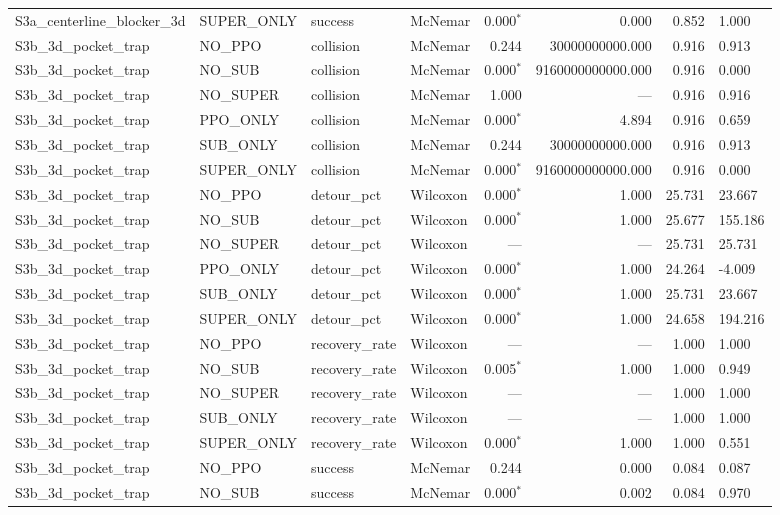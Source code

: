 \begin{tabular}{llllrrrl}
  S3a_centerline_blocker_3d & SUPER_ONLY & success & McNemar & 0.000$^{*}$ & 0.000 & 0.852 & 1.000 \\
  S3b_3d_pocket_trap & NO_PPO & collision & McNemar & 0.244 & 30000000000.000 & 0.916 & 0.913 \\
  S3b_3d_pocket_trap & NO_SUB & collision & McNemar & 0.000$^{*}$ & 9160000000000.000 & 0.916 & 0.000 \\
  S3b_3d_pocket_trap & NO_SUPER & collision & McNemar & 1.000 & --- & 0.916 & 0.916 \\
  S3b_3d_pocket_trap & PPO_ONLY & collision & McNemar & 0.000$^{*}$ & 4.894 & 0.916 & 0.659 \\
  S3b_3d_pocket_trap & SUB_ONLY & collision & McNemar & 0.244 & 30000000000.000 & 0.916 & 0.913 \\
  S3b_3d_pocket_trap & SUPER_ONLY & collision & McNemar & 0.000$^{*}$ & 9160000000000.000 & 0.916 & 0.000 \\
  S3b_3d_pocket_trap & NO_PPO & detour_pct & Wilcoxon & 0.000$^{*}$ & 1.000 & 25.731 & 23.667 \\
  S3b_3d_pocket_trap & NO_SUB & detour_pct & Wilcoxon & 0.000$^{*}$ & 1.000 & 25.677 & 155.186 \\
  S3b_3d_pocket_trap & NO_SUPER & detour_pct & Wilcoxon & --- & --- & 25.731 & 25.731 \\
  S3b_3d_pocket_trap & PPO_ONLY & detour_pct & Wilcoxon & 0.000$^{*}$ & 1.000 & 24.264 & -4.009 \\
  S3b_3d_pocket_trap & SUB_ONLY & detour_pct & Wilcoxon & 0.000$^{*}$ & 1.000 & 25.731 & 23.667 \\
  S3b_3d_pocket_trap & SUPER_ONLY & detour_pct & Wilcoxon & 0.000$^{*}$ & 1.000 & 24.658 & 194.216 \\
  S3b_3d_pocket_trap & NO_PPO & recovery_rate & Wilcoxon & --- & --- & 1.000 & 1.000 \\
  S3b_3d_pocket_trap & NO_SUB & recovery_rate & Wilcoxon & 0.005$^{*}$ & 1.000 & 1.000 & 0.949 \\
  S3b_3d_pocket_trap & NO_SUPER & recovery_rate & Wilcoxon & --- & --- & 1.000 & 1.000 \\
  S3b_3d_pocket_trap & SUB_ONLY & recovery_rate & Wilcoxon & --- & --- & 1.000 & 1.000 \\
  S3b_3d_pocket_trap & SUPER_ONLY & recovery_rate & Wilcoxon & 0.000$^{*}$ & 1.000 & 1.000 & 0.551 \\
  S3b_3d_pocket_trap & NO_PPO & success & McNemar & 0.244 & 0.000 & 0.084 & 0.087 \\
  S3b_3d_pocket_trap & NO_SUB & success & McNemar & 0.000$^{*}$ & 0.002 & 0.084 & 0.970 \\

\end{tabular}
